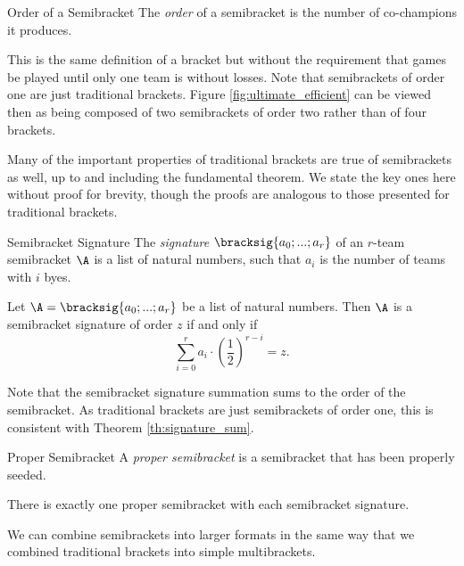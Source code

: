 {    \begin{definition}{Order of a Semibracket}{}
        The \textit{order} of a semibracket is the number of co-champions it produces.
    \end{definition}

    This is the same definition of a bracket but without the requirement that games be played until only one team is without losses. Note that semibrackets of order one are just traditional brackets. Figure \ref{fig:ultimate_efficient} can be viewed then as being composed of two semibrackets of order two rather than of four brackets.
    
    Many of the important properties of traditional brackets are true of semibrackets as well, up to and including the fundamental theorem. We state the key ones here without proof for brevity, though the proofs are analogous to those presented for traditional brackets.

    \begin{definition}{Semibracket Signature}{}
        The \textit{signature} $\bracksig{a_0; ...; a_r}$ of an $r$-team semibracket $\A$ is a list of natural numbers, such that $a_i$ is the number of teams with $i$ byes.
    \end{definition}

    \begin{theorem}{}{}
        Let $\A = \bracksig{a_0; ...; a_r}$ be a list of natural numbers. Then $\A$ is a semibracket signature of order $z$ if and only if $$\sum_{i=0}^r a_i \cdot \left(\frac{1}{2}\right)^{r - i} = z.$$
    \end{theorem}

    Note that the semibracket signature summation sums to the order of the semibracket. As traditional brackets are just semibrackets of order one, this is consistent with Theorem \ref{th:signature_sum}.

    \begin{definition}{Proper Semibracket}{}
        A \textit{proper semibracket} is a semibracket that has been properly seeded.
    \end{definition}

    \begin{theorem}{}{}
        There is exactly one proper semibracket with each semibracket signature.
    \end{theorem}

    We can combine semibrackets into larger formats in the same way that we combined traditional brackets into simple multibrackets.

}
